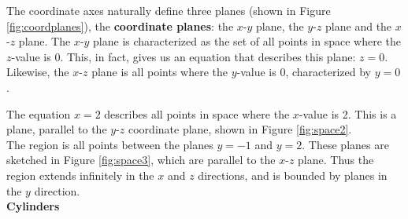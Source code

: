 The coordinate axes naturally define three planes (shown in Figure \ref{fig:coordplanes}), the \textbf{coordinate planes}: the $x$-$y$ plane, the $y$-$z$ plane and the $x$-$z$ plane. The $x$-$y$ plane is characterized as the set of all points in space where the $z$-value is 0. %
This, in fact, gives us an equation that describes this plane: $z=0$. Likewise, the $x$-$z$ plane is all points where the $y$-value is 0, characterized by $y=0$.

The equation $x=2$ describes all points in space where the $x$-value is 2. This is a plane, parallel to the $y$-$z$ coordinate plane, shown in Figure \ref{fig:space2}.\\

{The region is all points between the planes $y=-1$ and $y=2$. These planes are sketched in Figure \ref{fig:space3}, which are parallel to the $x$-$z$ plane. Thus the region extends infinitely in the $x$ and $z$ directions, and is bounded by planes in the $y$ direction.
}\\



\noindent\textbf{\large Cylinders}\\

